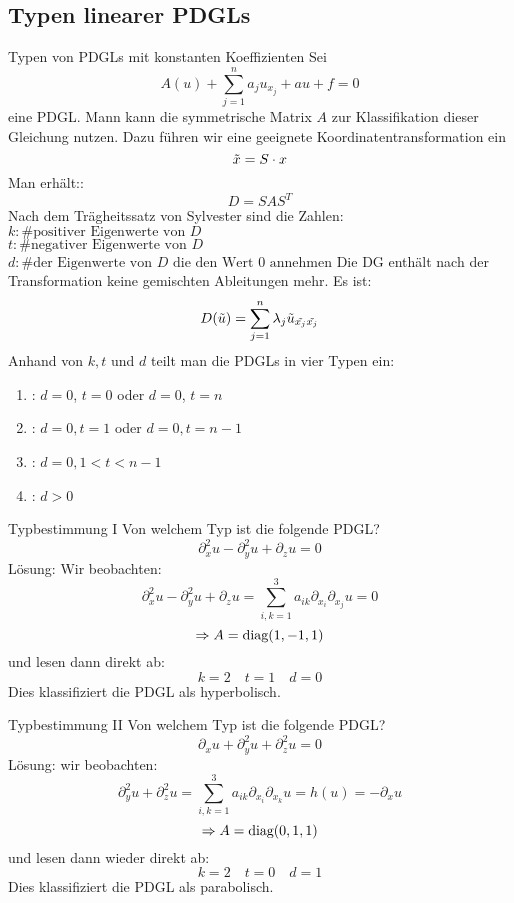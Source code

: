 \subsection{Typen linearer PDGLs}
\begin{Def}{Typen von PDGLs mit konstanten Koeffizienten}
    Sei $$A(u)+\sum_{j=1}^n a_ju_{x_j}+au+f=0$$
    eine PDGL. Mann kann die symmetrische Matrix $A$ zur Klassifikation dieser Gleichung nutzen. Dazu führen wir eine geeignete Koordinatentransformation ein
    $$\Tilde{x}=S\cdot x$$
    Man erhält::
    $$D=SAS^T$$
    Nach dem Trägheitssatz von Sylvester sind die Zahlen: \\
    $k: \mbox{\# positiver Eigenwerte von $D$}$ \\
    $t: \mbox{\# negativer Eigenwerte von $D$}$ \\
    $d: \mbox{\# der Eigenwerte von $D$ die den Wert $0$ annehmen}$
    Die DG enthält nach der Transformation keine gemischten Ableitungen mehr. Es ist:
    $$D(\Tilde{u})=\sum_{j=1}^n \lambda_j \Tilde{u}_{\Tilde{x_j}\Tilde{x_j}}$$
    Anhand von $k,t$ und $d$ teilt man die PDGLs in vier Typen ein:
    \begin{enumerate}
        \item {}: $d=0$, $t=0$ oder $d=0$, $t=n$
        \item {}: $d=0, t=1$ oder $d=0, t=n-1$
        \item {}: $d=0, 1<t<n-1$
        \item {}: $d>0$
    \end{enumerate}
\end{Def}
\begin{Beispiel}{Typbestimmung I}
Von welchem Typ ist die folgende PDGL?
$$\partial_x^2 u - \partial_y^2 u + \partial_z u = 0$$
Lösung: Wir beobachten:
$$\partial_x^2 u - \partial_y^2 u + \partial_z u = \sum_{i,k=1}^3 a_{ik}\partial_{x_i}\partial_{x_j} u = 0$$
$$\Rightarrow A=\text{diag}(1,-1,1)$$
und lesen dann direkt ab:
$$k=2\quad t=1\quad d=0$$
Dies klassifiziert die PDGL als hyperbolisch.
\end{Beispiel}
\begin{Beispiel}{Typbestimmung II}
    Von welchem Typ ist die folgende PDGL?
    $$\partial_x u + \partial_y^2 u +\partial_z^2 u = 0$$
    Lösung: wir beobachten:
    $$\partial_y^2 u + \partial_z^2 u = \sum_{i,k=1}^3 a_{ik}\partial_{x_i}\partial_{x_k}u = h(u)=-\partial_x u$$
    $$\Rightarrow A=\text{diag}(0,1,1)$$
    und lesen dann wieder direkt ab:
    $$k=2\quad t= 0 \quad d=1$$
    Dies klassifiziert die PDGL als parabolisch.
\end{Beispiel}
